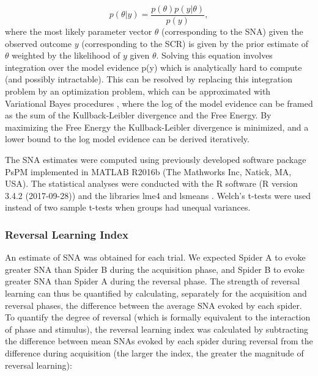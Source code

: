 \documentclass[12pt]{article}
\begin{document}
\begin{equation}
p(\theta|y) = \frac{p(\theta)p(y|\theta)}{p(y)},
\end{equation}
where the most likely parameter vector \(\theta\) (corresponding to the SNA)
given the observed outcome \(y\) (corresponding to the SCR) is given by
the prior estimate of \(\theta\) weighted by the likelihood of \(y\) given
\(\theta\). Solving this equation involves integration over the model
evidence p(y) which is analytically hard to compute (and possibly
intractable). This can be resolved by replacing this integration problem
by an optimization problem, which can be approximated with Variational
Bayes procedures \cite{Friston2006a}, where the log of the model
evidence can be framed as the sum of the Kullback-Leibler divergence and
the Free Energy. By maximizing the Free Energy the Kullback-Leibler
divergence is minimized, and a lower bound to the log model evidence can
be derived iteratively.

The SNA estimates were computed using previously developed software
package PsPM \cite{Bach2010} implemented in MATLAB R2016b (The
Mathworks Inc, Natick, MA, USA). The statistical analyses were conducted
with the R software \cite{R-Core-Team2016}
(R version 3.4.2 (2017-09-28)) and the libraries lme4 \cite{Bates2005} and lsmeans
\cite{Lenth2016}. Welch's t-tests were used instead of two sample
t-tests when groups had unequal variances.

\subsubsection*{Reversal Learning Index}
\label{sec:orge7d4d66}
An estimate of SNA was obtained for each trial. We expected Spider A to
evoke greater SNA than Spider B during the acquisition phase, and Spider
B to evoke greater SNA than Spider A during the reversal phase. The
strength of reversal learning can thus be quantified by calculating,
separately for the acquisition and reversal phases, the difference
between the average SNA evoked by each spider. To quantify the degree of
reversal (which is formally equivalent to the interaction of phase and
stimulus), the reversal learning index was calculated by subtracting the
difference between mean SNAs evoked by each spider during reversal from
the difference during acquisition (the larger the index, the greater the
magnitude of reversal learning):
\end{document}
